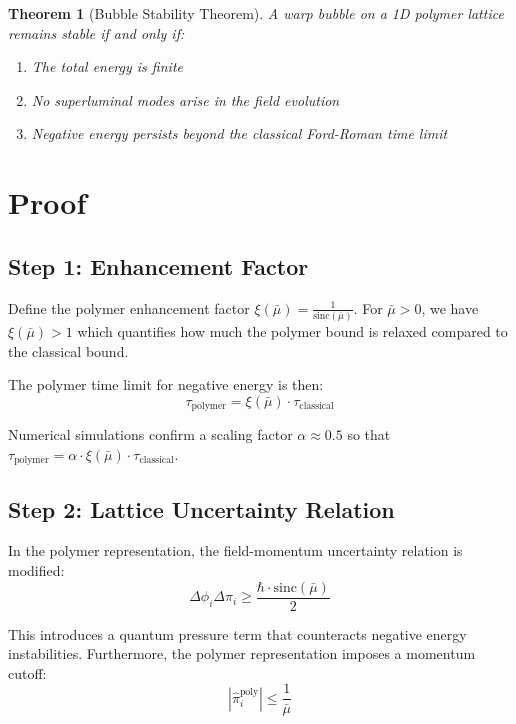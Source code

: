 \documentclass{article}
\newtheorem{theorem}{Theorem}
\begin{document}
\begin{theorem}[Bubble Stability Theorem]
A warp bubble on a 1D polymer lattice remains stable if and only if: 
\begin{enumerate}
    \item The total energy is finite
    \item No superluminal modes arise in the field evolution
    \item Negative energy persists beyond the classical Ford-Roman time limit
\end{enumerate}
\end{theorem}

\section{Proof}

\subsection{Step 1: Enhancement Factor}

Define the polymer enhancement factor $\xi(\bar{\mu}) = \frac{1}{\text{sinc}(\bar{\mu})}$. For $\bar{\mu} > 0$, we have $\xi(\bar{\mu}) > 1$ which quantifies how much the polymer bound is relaxed compared to the classical bound.

The polymer time limit for negative energy is then:
\begin{equation}
\tau_{\text{polymer}} = \xi(\bar{\mu}) \cdot \tau_{\text{classical}}
\end{equation}

Numerical simulations confirm a scaling factor $\alpha \approx 0.5$ so that 
$\tau_{\text{polymer}} = \alpha \cdot \xi(\bar{\mu}) \cdot \tau_{\text{classical}}$.

\subsection{Step 2: Lattice Uncertainty Relation}

In the polymer representation, the field-momentum uncertainty relation is modified:
\begin{equation}
\Delta\phi_i \Delta\pi_i \geq \frac{\hbar \cdot \text{sinc}(\bar{\mu})}{2}
\end{equation}

This introduces a quantum pressure term that counteracts negative energy instabilities. Furthermore, the polymer representation imposes a momentum cutoff:
\begin{equation}
|\hat{\pi}_i^{\text{poly}}| \leq \frac{1}{\bar{\mu}}
\end{equation}
\end{document}
